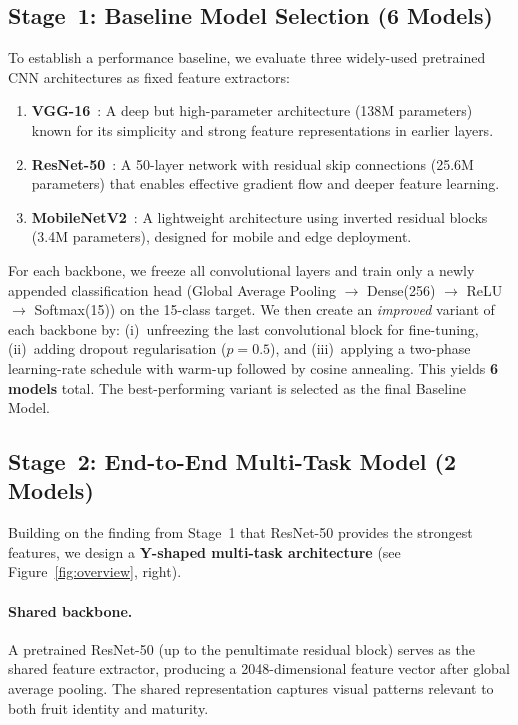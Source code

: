 \documentclass[10pt,twocolumn,letterpaper]{article}
\begin{document}
\subsection{Stage~1: Baseline Model Selection (6 Models)}
\label{sec:stage1}

To establish a performance baseline, we evaluate three widely-used pretrained CNN architectures as fixed feature extractors:
\begin{enumerate}
  \item \textbf{VGG-16}~\cite{simonyan2014very}: A deep but high-parameter architecture (138M parameters) known for its simplicity and strong feature representations in earlier layers.
  \item \textbf{ResNet-50}~\cite{he2016deep}: A 50-layer network with residual skip connections (25.6M parameters) that enables effective gradient flow and deeper feature learning.
  \item \textbf{MobileNetV2}~\cite{sandler2018mobilenetv2}: A lightweight architecture using inverted residual blocks (3.4M parameters), designed for mobile and edge deployment.
\end{enumerate}

For each backbone, we freeze all convolutional layers and train only a newly appended classification head (Global Average Pooling $\rightarrow$ Dense(256) $\rightarrow$ ReLU $\rightarrow$ Softmax(15)) on the 15-class target.
We then create an \emph{improved} variant of each backbone by:
(i)~unfreezing the last convolutional block for fine-tuning,
(ii)~adding dropout regularisation ($p = 0.5$), and
(iii)~applying a two-phase learning-rate schedule with warm-up followed by cosine annealing.
This yields \textbf{6 models} total.
The best-performing variant is selected as the final Baseline Model.

\subsection{Stage~2: End-to-End Multi-Task Model (2 Models)}
\label{sec:stage2}

Building on the finding from Stage~1 that ResNet-50 provides the strongest features, we design a \textbf{Y-shaped multi-task architecture} (see Figure~\ref{fig:overview}, right).

\paragraph{Shared backbone.}
A pretrained ResNet-50 (up to the penultimate residual block) serves as the shared feature extractor, producing a 2048-dimensional feature vector after global average pooling.
The shared representation captures visual patterns relevant to both fruit identity and maturity.
\end{document}
